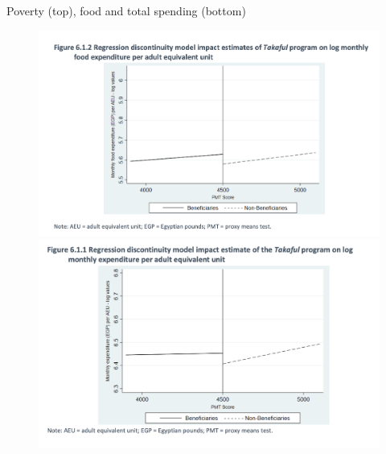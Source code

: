 \documentclass{beamer}
\begin{document}
\begin{frame}{Poverty (top), food and total spending (bottom)}
\begin{figure}
        \begin{minipage}{0.5\textwidth}
            \includegraphics[width=\textwidth]{./lecture_includes/takaful_rdd2.png}
        \end{minipage}\hfill
        \begin{minipage}{0.5\textwidth}
            \includegraphics[width=\textwidth]{./lecture_includes/takaful_rdd1.png}
        \end{minipage}
    \end{figure}
\end{frame}
\end{document}
